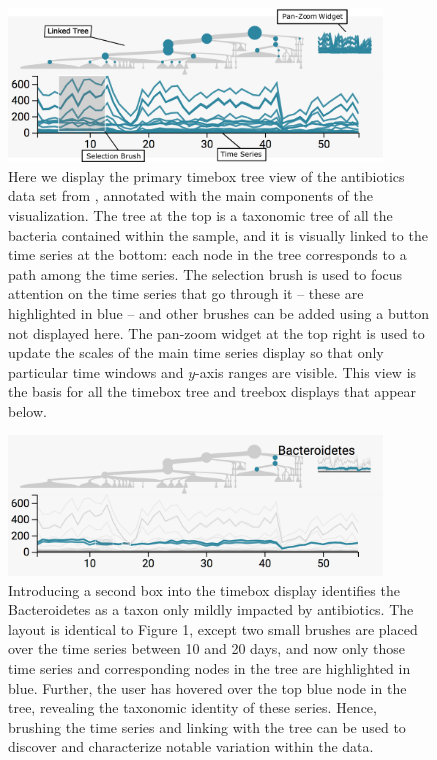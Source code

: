\documentclass{report}
\begin{document}
\begin{figure}

{\centering \includegraphics[width=375px]{figure/treelapse/annotated_antibiotic_overview}

}

\caption{Here we display the primary timebox tree view of the antibiotics data
  set from \citep{dethlefsen2008pervasive}, annotated with the main components of the
  visualization. The tree at the top is a taxonomic tree of all the bacteria
  contained within the sample, and it is visually linked to the time series at
  the bottom: each node in the tree corresponds to a path among the time series.
  The selection brush is used to focus attention on the time series that go
  through it -- these are highlighted in blue -- and other brushes can be added
  using a button not displayed here. The pan-zoom widget at the top right is
  used to update the scales of the main time series display so that only
  particular time windows and $y$-axis ranges are visible. This view is the
  basis for all the timebox tree and treebox displays that appear
  below. \label{fig:antibioticoverview}}
\end{figure}

\begin{figure}

{\centering \includegraphics[width=375px]{figure/treelapse/antibiotic_bacteroidetes}

}

\caption{Introducing a second box into the timebox display identifies the
  Bacteroidetes as a taxon only mildly impacted by antibiotics. The layout is
  identical to Figure 1, except two small brushes are placed over the time
  series between 10 and 20 days, and now only those time series and
  corresponding nodes in the tree are highlighted in blue. Further, the user has
  hovered over the top blue node in the tree, revealing the taxonomic identity
  of these series. Hence, brushing the time series and linking with the tree can
  be used to discover and characterize notable variation within the
  data.\label{fig:antibioticbacteroidetes}}
\end{figure}
\end{document}
